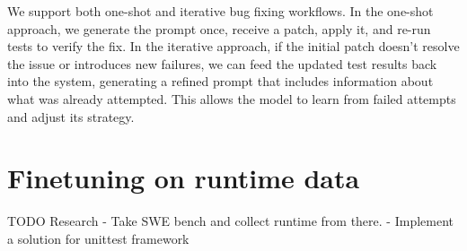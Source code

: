We support both one-shot and iterative bug fixing workflows. In the one-shot approach, we generate the prompt once, receive a patch, apply it, and re-run tests to verify the fix. In the iterative approach, if the initial patch doesn't resolve the issue or introduces new failures, we can feed the updated test results back into the system, generating a refined prompt that includes information about what was already attempted. This allows the model to learn from failed attempts and adjust its strategy.

\section{Finetuning on runtime data}

TODO Research
- Take SWE bench and collect runtime from there.
- Implement a solution for unittest framework
